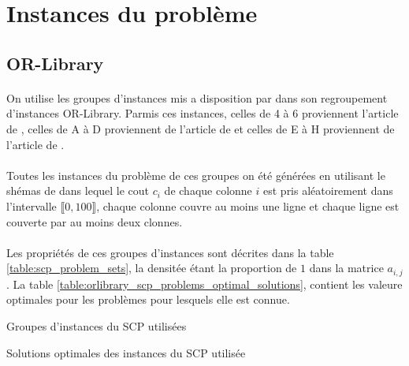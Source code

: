 \documentclass[12pt,letterpaper,twoside]{article}
\begin{document}
	\section{Instances du problème}
		\subsection{OR-Library}
			\paragraph*{}
				On utilise les groupes d'instances mis a disposition par \citeauthor{OR-Library} dans son regroupement d'instances OR-Library\cite{OR-Library}. Parmis ces instances, celles de 4 à 6 proviennent l'article \cite{Balas1980} de \citeauthor{Balas1980}, celles de A à D proviennent de l'article \cite{Beasley1987} de \citeauthor{Beasley1987} et celles de E à H proviennent de l'article \cite{Beasley1990} de \citeauthor{Beasley1990}.
			\paragraph*{}
				Toutes les instances du problème de ces groupes on été générées en utilisant le shémas de \citeauthor{Balas1980}\cite{Balas1980} dans lequel le cout \(c_i\) de chaque colonne \(i\) est pris aléatoirement dans l'intervalle \(\llbracket0,100\rrbracket\), chaque colonne couvre au moins une ligne et chaque ligne est couverte par au moins deux clonnes.
			\paragraph*{}
			   Les propriétés de ces groupes d'instances sont décrites dans la table \ref{table:scp_problem_sets}, la densitée étant la proportion de \(1\) dans la matrice \(a_{i,j}\). La table \ref{table:orlibrary_scp_problems_optimal_solutions}, contient les valeure optimales pour les problèmes pour lesquels elle est connue.
			\begin{table}[H]
				\centering
				
				\caption{Groupes d'instances du SCP utilisées\cite{OR-Library,Balas1980,Beasley1987,Beasley1990}}
				\label{table:scp_problem_sets}
			\end{table}
			\begin{table}[H]
				\centering
				\begin{minipage}[t]{0.45\linewidth}
					\centering
					
				\end{minipage}
				\begin{minipage}[t]{0.45\linewidth}
					\centering
					
				\end{minipage}
				\caption{Solutions optimales des instances du SCP utilisée\cite{Beasley1990}}
				\label{table:orlibrary_scp_problems_optimal_solutions}
			\end{table}
\end{document}
